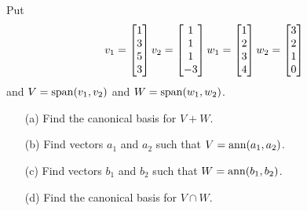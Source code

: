 \documentclass[a4paper]{amsart}
\begin{document}
\begin{exercise}\label{ex-plus-cap-i}
 Put 
 \[ v_1 = \left[\begin{matrix} 1 \\ 3 \\ 5 \\ 3 \end{matrix}\right] 
    v_2 = \left[\begin{matrix} 1 \\ 1 \\ 1 \\ -3 \end{matrix}\right] 
    w_1 = \left[\begin{matrix} 1 \\ 2 \\ 3 \\ 4 \end{matrix}\right]
    w_2 = \left[\begin{matrix} 3 \\ 2 \\ 1 \\ 0 \end{matrix}\right]
 \]
 and $V=\operatorname{span}(v_1,v_2)$ and $W=\operatorname{span}(w_1,w_2)$.
 \begin{itemize}
  \item[(a)] Find the canonical basis for $V+W$.
  \item[(b)] Find vectors $a_1$ and $a_2$ such that
   $V=\operatorname{ann}(a_1,a_2)$. 
  \item[(c)] Find vectors $b_1$ and $b_2$ such that
   $W=\operatorname{ann}(b_1,b_2)$. 
  \item[(d)] Find the canonical basis for $V\cap W$.
 \end{itemize}
\end{exercise}
\end{document}
